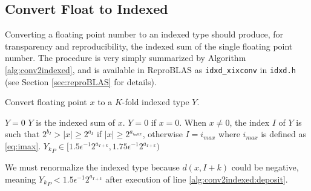 \subsection{Convert Float to Indexed}
    \label{sec:primitiveops_conv2indexed}
    Converting a floating point number to an indexed type should produce, for
    transparency and reproducibility, the indexed sum of the single floating
    point number.
    The procedure is very simply summarized by Algorithm \ref{alg:conv2indexed}, and is available in ReproBLAS as \texttt{idxd\_xixconv} in \texttt{idxd.h} (see Section \ref{sec:reproBLAS} for details).

    \begin{samepage}
    \begin{alg}
      Convert floating point $x$ to a $K$-fold indexed type $Y$.
      \begin{algorithmic}[1]
          \State $Y = 0$
          \State {}
          \State {} \label{alg:conv2indexed:deposit}
          \State {}
        \EndFunction
        \Ensure
          $Y$ is the indexed sum of $x$. $Y=0$ if $x=0$.
          When $x \neq 0$, the index $I$ of $Y$ is such that $2^{b_I} > |x| \geq 2^{a_I}$
          if $|x| \geq 2^{a_{i_max}}$, otherwise $I = i_{max}$ where $i_{max}$ is defined as \eqref{eq:imax}.
          ${Y_k}_P \in [1.5  \epsilon^{-1} 2^{a_{I + k}}, 1.75  \epsilon^{-1} 2^{a_{I + k}})$
      \end{algorithmic}
      \label{alg:conv2indexed}
    \end{alg}
    \end{samepage}

    We must renormalize the indexed type because $d(x, I + k)$ could be
    negative, meaning ${Y_k}_P < 1.5  \epsilon^{-1} 2^{a_{I + k}}$ after
    execution of line \ref{alg:conv2indexed:deposit}.
